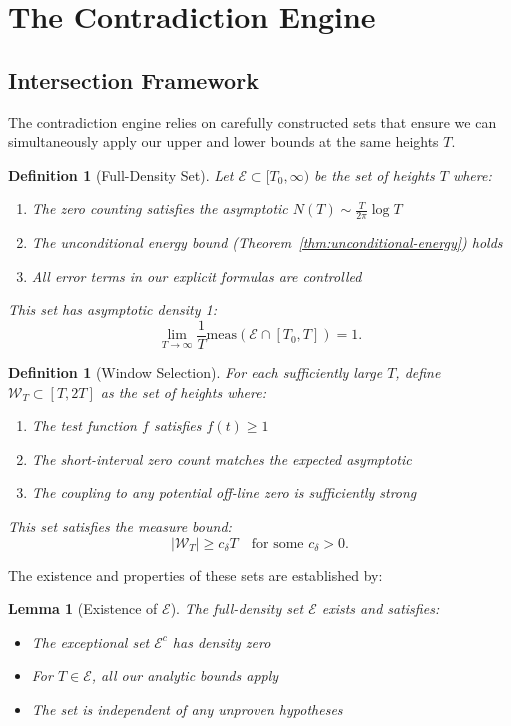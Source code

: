 \documentclass[11pt,hyp,]{nyjm}
\newtheorem{lemma}[theorem]{Lemma}
\newtheorem{definition}[theorem]{Definition}
\begin{document}
\section{The Contradiction Engine}

\subsection{Intersection Framework}

The contradiction engine relies on carefully constructed sets that ensure we can simultaneously apply our upper and lower bounds at the same heights $T$.

\begin{definition}[Full-Density Set]\label{def:full-density-set}
Let $\mathcal{E} \subset [T_0, \infty)$ be the set of heights $T$ where:
\begin{enumerate}
\item The zero counting satisfies the asymptotic $N(T) \sim \frac{T}{2\pi}\log T$
\item The unconditional energy bound (Theorem~\ref{thm:unconditional-energy}) holds
\item All error terms in our explicit formulas are controlled
\end{enumerate}
This set has asymptotic density 1:
\[
\lim_{T \to \infty} \frac{1}{T} \text{meas}(\mathcal{E} \cap [T_0, T]) = 1.
\]
\end{definition}

\begin{definition}[Window Selection]\label{def:window-selection}
For each sufficiently large $T$, define $\mathcal{W}_T \subset [T, 2T]$ as the set of heights where:
\begin{enumerate}
\item The test function $f$ satisfies $f(t) \geq 1$
\item The short-interval zero count matches the expected asymptotic
\item The coupling to any potential off-line zero is sufficiently strong
\end{enumerate}
This set satisfies the measure bound:
\[
|\mathcal{W}_T| \geq c_\delta T \quad \text{for some } c_\delta > 0.
\]
\end{definition}

The existence and properties of these sets are established by:

\begin{lemma}[Existence of $\mathcal{E}$]\label{lem:existence-E}
The full-density set $\mathcal{E}$ exists and satisfies:
\begin{itemize}
\item The exceptional set $\mathcal{E}^c$ has density zero
\item For $T \in \mathcal{E}$, all our analytic bounds apply
\item The set is independent of any unproven hypotheses
\end{itemize}
\end{lemma}
\end{document}
